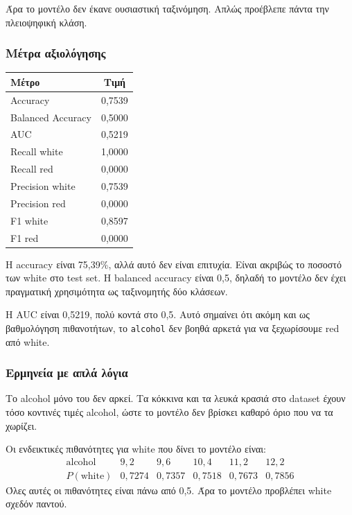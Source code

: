 \documentclass[11pt,a4paper]{article}
\newcommand{\code}[1]{\texttt{#1}}
\begin{document}
Άρα το μοντέλο δεν έκανε ουσιαστική ταξινόμηση. Απλώς προέβλεπε πάντα την
πλειοψηφική κλάση.

\subsubsection{Μέτρα αξιολόγησης}

\begin{center}
\begin{tabular}{lc}
\toprule
Μέτρο & Τιμή \\
\midrule
Accuracy & 0,7539 \\
Balanced Accuracy & 0,5000 \\
AUC & 0,5219 \\
Recall white & 1,0000 \\
Recall red & 0,0000 \\
Precision white & 0,7539 \\
Precision red & 0,0000 \\
F1 white & 0,8597 \\
F1 red & 0,0000 \\
\bottomrule
\end{tabular}
\end{center}

Η accuracy είναι 75,39\%, αλλά αυτό δεν είναι επιτυχία. Είναι ακριβώς το
ποσοστό των white στο test set. Η balanced accuracy είναι 0,5, δηλαδή το
μοντέλο δεν έχει πραγματική χρησιμότητα ως ταξινομητής δύο κλάσεων.

Η AUC είναι 0,5219, πολύ κοντά στο 0,5. Αυτό σημαίνει ότι ακόμη και ως
βαθμολόγηση πιθανοτήτων, το \code{alcohol} δεν βοηθά αρκετά για να ξεχωρίσουμε
red από white.

\subsubsection{Ερμηνεία με απλά λόγια}

Το alcohol μόνο του δεν αρκεί. Τα κόκκινα και τα λευκά κρασιά στο dataset
έχουν τόσο κοντινές τιμές alcohol, ώστε το μοντέλο δεν βρίσκει καθαρό όριο
που να τα χωρίζει.

Οι ενδεικτικές πιθανότητες για white που δίνει το μοντέλο είναι:
\[
\begin{array}{c|ccccc}
\text{alcohol} & 9{,}2 & 9{,}6 & 10{,}4 & 11{,}2 & 12{,}2 \\
\hline
P(\text{white}) & 0{,}7274 & 0{,}7357 & 0{,}7518 & 0{,}7673 & 0{,}7856
\end{array}
\]
Όλες αυτές οι πιθανότητες είναι πάνω από 0,5. Άρα το μοντέλο προβλέπει
white σχεδόν παντού.
\end{document}
